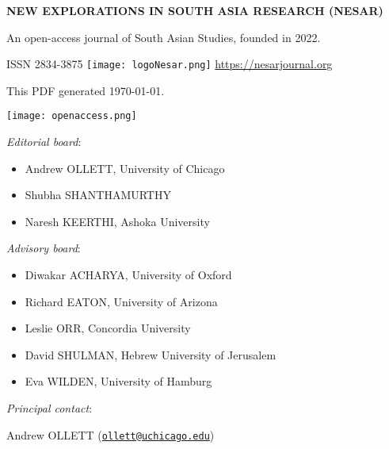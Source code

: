 \thispagestyle{empty}
\begingroup
\small

\noindent\begin{minipage}[t]{0.8\textwidth}
\noindent\textbf{NEW EXPLORATIONS IN SOUTH ASIA RESEARCH (NESAR)}\smallskip

\noindent An open-access journal of South Asian Studies, founded in 2022.\medskip

\noindent ISSN 2834-3875 \hspace{0.25em} \texttt{[image: logoNesar.png]} \hspace{0.25em} \url{https://nesarjournal.org}\medskip

\noindent This PDF generated \today.
\end{minipage}
\begin{minipage}[t]{0.2\textwidth}
\texttt{[image: openaccess.png]}
\end{minipage}

\bigskip\bigskip

\noindent\emph{Editorial board}:\smallskip

\noindent\begin{itemize}[itemsep=2pt,parsep=0pt,leftmargin=0.45cm,label={}]
\item Andrew \textsc{OLLETT}, University of Chicago
\item Shubha \textsc{SHANTHAMURTHY}
\item Naresh \textsc{KEERTHI}, Ashoka University
\end{itemize}\medskip

\noindent\emph{Advisory board}:\smallskip

\noindent\begin{itemize}[itemsep=2pt,parsep=0pt,leftmargin=0.45cm,label={}]
\item Diwakar \textsc{ACHARYA}, University of Oxford
\item Richard \textsc{EATON}, University of Arizona
\item Leslie \textsc{ORR}, Concordia University
\item David \textsc{SHULMAN}, Hebrew University of Jerusalem
\item Eva \textsc{WILDEN}, University of Hamburg
\end{itemize}\medskip

\noindent\emph{Principal contact}:\smallskip

\noindent\hspace{0.45cm}Andrew \textsc{OLLETT} (\href{mailto:ollett@uchicago.edu}{\texttt{\color{Nesarlink}ollett@uchicago.edu}})\bigskip\bigskip

